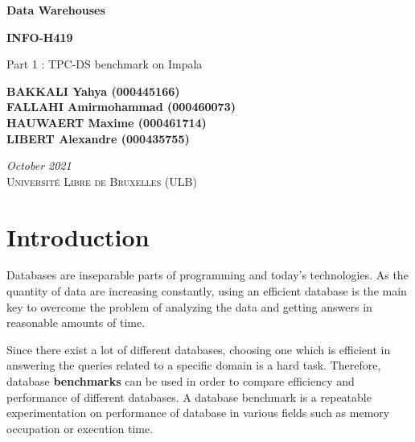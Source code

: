 \documentclass{article}
\newcommand\bld[1]{\textbf{#1}}
\begin{document}
\begin{titlepage}
    \begin{center}
        \BgThispage
        \vspace*{1cm}
        
        
        \huge
        \textbf{Data Warehouses}
        \vspace{0.25cm}
        
        \LARGE
        \textbf{INFO-H419}
        
        \vspace{0.5cm}
        \LARGE
        {Part 1 : TPC-DS benchmark on Impala}
        
        
        \vspace{3.5cm}
        
        \textbf{BAKKALI Yahya (000445166) \\}
        \textbf{FALLAHI Amirmohammad (000460073) \\}
        \textbf{HAUWAERT Maxime (000461714) \\}
        \textbf{LIBERT Alexandre (000435755) \\}
    
        \vspace{2.5cm}
        \textit{October 2021 \\}
        \vspace{0.5cm}
        \textsc{Université Libre de Bruxelles (ULB)}
        
        
    \end{center}
\end{titlepage}

\tableofcontents
\thispagestyle{empty}
\newpage
\setcounter{page}{1}
\setlength{\parskip}{1em}

\section{Introduction}
Databases are inseparable parts of programming and today's technologies. As the quantity of data are increasing constantly, using an efficient database is the main key to overcome the problem of analyzing the data and getting answers in reasonable amounts of time.

Since there exist a lot of different databases, choosing one which is efficient in answering the queries related to a specific domain is a hard task. Therefore, database \bld{benchmarks} can be used in order to compare efficiency and performance of different databases. A database benchmark is a repeatable experimentation on performance of database in various fields such as memory occupation or execution time. 
\end{document}
